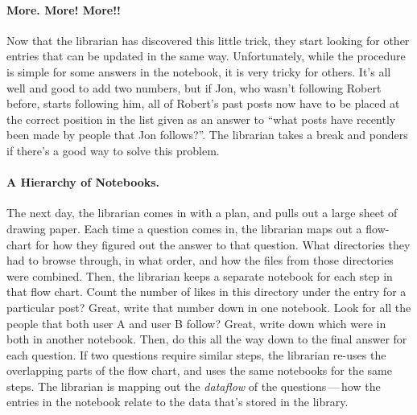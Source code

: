 \paragraph{More. More! More!!}
%
Now that the librarian has discovered this little trick, they start looking for
other entries that can be updated in the same way. Unfortunately, while the
procedure is simple for some answers in the notebook, it is very tricky for
others. It's all well and good to add two numbers, but if Jon, who wasn't
following Robert before, starts following him, all of Robert's past posts now
have to be placed at the correct position in the list given as an answer to
``what posts have recently been made by people that Jon follows?''. The
librarian takes a break and ponders if there's a good way to solve this problem.

\paragraph{A Hierarchy of Notebooks.}
%
The next day, the librarian comes in with a plan, and pulls out a large sheet of
drawing paper. Each time a question comes in, the librarian maps out a
flow-chart for how they figured out the answer to that question. What
directories they had to browse through, in what order, and how the files from
those directories were combined. Then, the librarian keeps a separate notebook
for each step in that flow chart. Count the number of likes in this directory
under the entry for a particular post? Great, write that number down in one
notebook. Look for all the people that both user A and user B follow? Great,
write down which were in both in another notebook. Then, do this all the way
down to the final answer for each question. If two questions require similar
steps, the librarian re-uses the overlapping parts of the flow chart, and uses
the same notebooks for the same steps. The librarian is mapping out the
\textit{dataflow} of the questions\,---\,how the entries in the notebook relate
to the data that's stored in the library.


